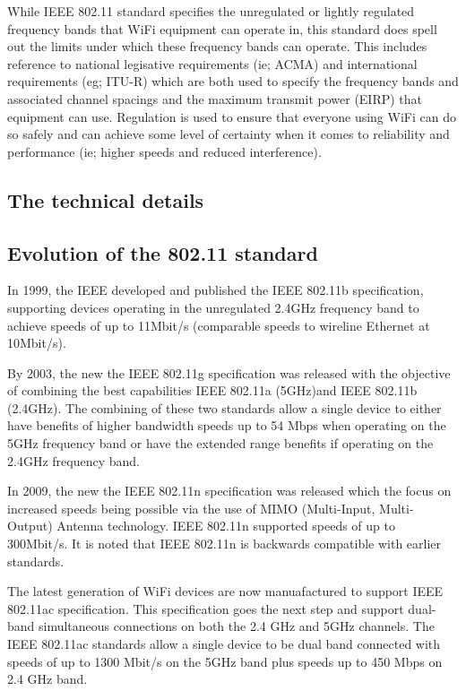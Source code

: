 While IEEE 802.11 standard specifies the unregulated or lightly regulated
frequency bands that WiFi equipment can operate in, this standard does
spell out the limits under which these frequency bands can operate.
This includes reference to national legisative requirements (ie; ACMA)
and international requirements (eg; ITU-R) which are both used to specify
the frequency bands and associated channel spacings and the maximum
transmit power (EIRP) that equipment can use. Regulation is used to
ensure that everyone using WiFi can do so safely and can achieve some
level of certainty when it comes to reliability and performance (ie;
higher speeds and reduced interference).

\subsection{The technical details}

\subsection{Evolution of the 802.11 standard}

In 1999, the IEEE developed and published the IEEE 802.11b specification,
supporting devices operating in the unregulated 2.4GHz frequency band to
achieve speeds of up to 11Mbit/s (comparable speeds to wireline Ethernet
at 10Mbit/s).

By 2003, the new the IEEE 802.11g specification was released with the
objective of combining the best capabilities IEEE 802.11a (5GHz)and IEEE
802.11b (2.4GHz). The combining of these two standards allow a single
device to either have benefits of higher bandwidth speeds up to 54 Mbps
when operating on the 5GHz frequency band or have the extended range
benefits if operating on the 2.4GHz frequency band.

In 2009, the new the IEEE 802.11n specification was released which the
focus on increased speeds being possible via the use of MIMO (Multi-Input,
Multi-Output) Antenna technology. IEEE 802.11n supported speeds of up
to 300Mbit/s. It is noted that IEEE 802.11n is backwards compatible with
earlier standards.

The latest generation of WiFi devices are now manuafactured to support
IEEE 802.11ac specification.  This specification goes the next step and
support dual-band simultaneous connections on both the 2.4 GHz and 5GHz
channels. The IEEE 802.11ac standards allow a single device to be dual
band connected with speeds of up to 1300 Mbit/s on the 5GHz band plus
speeds up to 450 Mbps on 2.4 GHz band.



